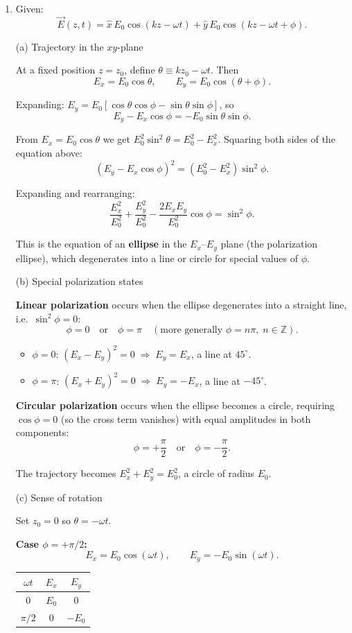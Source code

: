 \documentclass[12pt]{article}
\begin{document}
\begin{enumerate}
\item Given:
\[
\vec{E}(z,t)
= \hat{x}\,E_0\cos(kz-\omega t)
+ \hat{y}\,E_0\cos(kz-\omega t+\phi).
\]

(a) Trajectory in the $xy$-plane

At a fixed position $z=z_0$, define $\theta \equiv kz_0-\omega t$. Then
\[
E_x = E_0\cos\theta, \qquad E_y = E_0\cos(\theta+\phi).
\]

Expanding: $E_y = E_0[\cos\theta\cos\phi - \sin\theta\sin\phi]$, so
\[
E_y - E_x\cos\phi = -E_0\sin\theta\sin\phi.
\]

From $E_x = E_0\cos\theta$ we get $E_0^2\sin^2\theta = E_0^2 - E_x^2$. Squaring both sides of the equation above:
\[
(E_y - E_x\cos\phi)^2 = (E_0^2 - E_x^2)\sin^2\phi.
\]

Expanding and rearranging:
\[
\boxed{\frac{E_x^2}{E_0^2} + \frac{E_y^2}{E_0^2}
- \frac{2E_x E_y}{E_0^2}\cos\phi = \sin^2\phi.}
\]

This is the equation of an \textbf{ellipse} in the $E_x$--$E_y$ plane (the polarization ellipse), which degenerates into a line or circle for special values of $\phi$.

(b) Special polarization states

\textbf{Linear polarization} occurs when the ellipse degenerates into a straight line, i.e.\ $\sin^2\phi=0$:
\[
\boxed{\phi = 0 \quad\text{or}\quad \phi = \pi
\quad (\text{more generally } \phi=n\pi,\; n\in\mathbb{Z}).}
\]
\begin{itemize}
    \item $\phi=0$: $(E_x - E_y)^2=0 \;\Rightarrow\; E_y=E_x$, a line at $45^\circ$.
    \item $\phi=\pi$: $(E_x+E_y)^2=0 \;\Rightarrow\; E_y=-E_x$, a line at $-45^\circ$.
\end{itemize}

\textbf{Circular polarization} occurs when the ellipse becomes a circle, requiring $\cos\phi=0$ (so the cross term vanishes) with equal amplitudes in both components:
\[
\boxed{\phi = +\frac{\pi}{2} \quad\text{or}\quad \phi = -\frac{\pi}{2}.}
\]

The trajectory becomes $E_x^2+E_y^2=E_0^2$, a circle of radius $E_0$.

(c) Sense of rotation

Set $z_0=0$ so $\theta = -\omega t$.

\textbf{Case $\phi = +\pi/2$:}
\[
E_x = E_0\cos(\omega t), \qquad E_y = -E_0\sin(\omega t).
\]

\begin{center}
\begin{tabular}{ccc}
\hline
$\omega t$ & $E_x$ & $E_y$ \\
\hline
$0$ & $E_0$ & $0$ \\
$\pi/2$ & $0$ & $-E_0$ \\
\hline
\end{tabular}
\end{center}


\end{enumerate}
\end{document}
